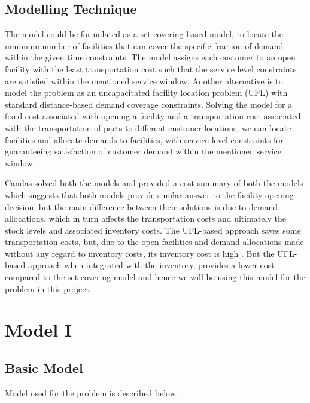 \documentclass[12pt]{article}
\numberwithin{equation}{section}
\begin{document}
\subsection{Modelling Technique}
The model could be formulated as a set covering-based model, to locate the minimum number of facilities that can cover the specific fraction of demand within the given time constraints. The model assigns each customer to an open facility with the least transportation cost such that the service level constraints are satisfied within the mentioned service window. 
Another alternative is to model the problem as an uncapacitated facility location problem (UFL) with standard distance-based demand coverage constraints. Solving the model for a fixed cost associated with opening a facility and a transportation cost associated with the transportation of parts to different customer locations, we can locate facilities and allocate demands to facilities, with service level constraints for  guaranteeing satisfaction of customer demand within the mentioned service window.

Candas \cite{CD} solved both the models and provided a cost summary of both the models which suggests that both models provide similar answer to the facility opening decision, but the main difference between their solutions is due to demand allocations, which in turn affects the transportation costs and ultimately the stock levels and associated inventory costs. The UFL-based approach saves some transportation costs, but, due to the open facilities and demand allocations made without any regard to inventory costs, its inventory cost is high \cite{CD}. But the UFL-based approach when integrated with the inventory, provides a lower cost compared to the set covering model and hence we will be using this model for the problem in this project.

\section{Model I}
\subsection{Basic Model} \label{Model}
Model used for the problem is described below:
\end{document}

